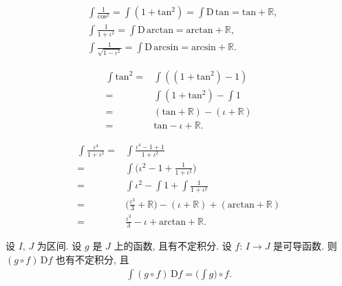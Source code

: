 \begin{example}
    \begin{align*}
         & \int {\frac{1}{\mathrm{cos}^2}} = \int {(1 + \mathrm{tan}^2)} = \int {\mathrm{D}\,\mathrm{tan}} = \mathrm{tan} + \mathbb{R}, \\
         & \int {\frac{1}{1 + \iota^2}} = \int {\mathrm{D}\,\mathrm{arctan}} = \mathrm{arctan} + \mathbb{R},                            \\
         & \int {\frac{1}{\sqrt{1 - \iota^2}}} = \int {\mathrm{D}\,\mathrm{arcsin}} = \mathrm{arcsin} + \mathbb{R}.
    \end{align*}
\end{example}

\begin{example}
    \begin{align*}
        \int {\mathrm{tan}^2}
        = {} & \int {((1 + \mathrm{tan}^2) - 1)}                  \\
        = {} & \int {(1 + \mathrm{tan}^2)} - \int {1}             \\
        = {} & (\mathrm{tan} + \mathbb{R}) - (\iota + \mathbb{R}) \\
        = {} & \mathrm{tan} - \iota + \mathbb{R}.
    \end{align*}
\end{example}

\begin{example}
    \begin{align*}
        \int {\frac{\iota^4}{1 + \iota^2}}
        = {} & \int {\frac{\iota^4 - 1 + 1}{1 + \iota^2}}                                                           \\
        = {} & \int {\Bigg( \iota^2 - 1 + \frac{1}{1 + \iota^2} \Bigg)}                                             \\
        = {} & \int {\iota^2} - \int {1} + \int {\frac{1}{1 + \iota^2}}                                             \\
        = {} & \Bigg( \frac{\iota^3}{3} + \mathbb{R} \Bigg) - (\iota + \mathbb{R}) + (\mathrm{arctan} + \mathbb{R}) \\
        = {} & \frac{\iota^3}{3} - \iota + \mathrm{arctan} + \mathbb{R}.
    \end{align*}
\end{example}

\begin{theorem}
    设 $I$, $J$ 为区间.
    设 $g$ 是 $J$ 上的函数, 且有不定积分.
    设 $f$: $I \to J$ 是可导函数.
    则 $(g \circ f)\, \mathrm{D}f$ 也有不定积分, 且
    \begin{align*}
        \int {(g \circ f)\, \mathrm{D}f} = \Bigg( \int {g} \Bigg) \circ f.
    \end{align*}
\end{theorem}

